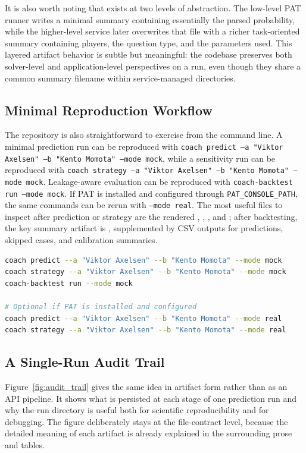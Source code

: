 \documentclass{article}
\begin{document}
It is also worth noting that  exists at two levels of abstraction. The low-level PAT runner writes a minimal summary containing essentially the parsed probability, while the higher-level service later overwrites that file with a richer task-oriented summary containing players, the question type, and the parameters used. This layered artifact behavior is subtle but meaningful: the codebase preserves both solver-level and application-level perspectives on a run, even though they share a common summary filename within service-managed directories.

\subsection*{Minimal Reproduction Workflow}
The repository is also straightforward to exercise from the command line. A minimal prediction run can be reproduced with \texttt{coach predict --a "Viktor Axelsen" --b "Kento Momota" --mode mock}, while a sensitivity run can be reproduced with \texttt{coach strategy --a "Viktor Axelsen" --b "Kento Momota" --mode mock}. Leakage-aware evaluation can be reproduced with \texttt{coach-backtest run --mode mock}. If PAT is installed and configured through \texttt{PAT\_CONSOLE\_PATH}, the same commands can be rerun with \texttt{--mode real}. The most useful files to inspect after prediction or strategy are the rendered , , , and ; after backtesting, the key summary artifact is , supplemented by CSV outputs for predictions, skipped cases, and calibration summaries.

\begin{lstlisting}[style=code,language=bash,caption={Minimal reproduction commands for prediction, strategy, and backtesting.}]
coach predict --a "Viktor Axelsen" --b "Kento Momota" --mode mock
coach strategy --a "Viktor Axelsen" --b "Kento Momota" --mode mock
coach-backtest run --mode mock

# Optional if PAT is installed and configured
coach predict --a "Viktor Axelsen" --b "Kento Momota" --mode real
coach strategy --a "Viktor Axelsen" --b "Kento Momota" --mode real
\end{lstlisting}

\subsection*{A Single-Run Audit Trail}
Figure~\ref{fig:audit_trail} gives the same idea in artifact form rather than as an API pipeline. It shows what is persisted at each stage of one prediction run and why the run directory is useful both for scientific reproducibility and for debugging. The figure deliberately stays at the file-contract level, because the detailed meaning of each artifact is already explained in the surrounding prose and tables.
\end{document}
